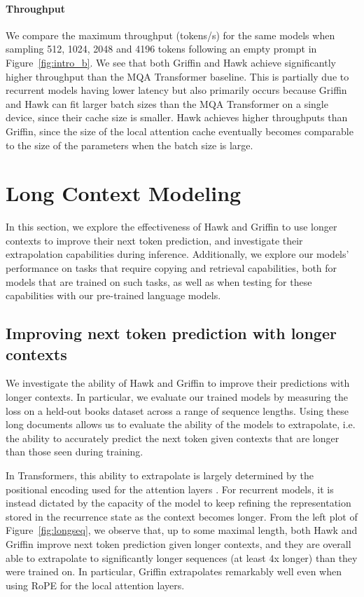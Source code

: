\paragraph{Throughput}
We compare the maximum throughput (tokens/s) for the same models when sampling 512, 1024, 2048 and 4196 tokens following an empty prompt in Figure~\ref{fig:intro_b}. 
We see that both Griffin and Hawk achieve significantly higher throughput than the MQA Transformer baseline. This is partially due to recurrent models having lower latency but also primarily occurs because Griffin and Hawk can fit larger batch sizes than the MQA Transformer on a single device, since their cache size is smaller. Hawk achieves higher throughputs than Griffin, since the size of the local attention cache eventually becomes comparable to the size of the parameters when the batch size is large.

\section{Long Context Modeling}
\label{sec:long_seq}

In this section, we explore the effectiveness of Hawk and Griffin to use longer contexts to improve their next token prediction, and investigate their extrapolation capabilities during inference. Additionally, we explore our models' performance on tasks that require copying and retrieval capabilities, both for models that are trained on such tasks, as well as when testing for these capabilities with our pre-trained language models.

\subsection{Improving next token prediction with longer contexts}

We investigate the ability of Hawk and Griffin to improve their predictions with longer contexts. In particular, we evaluate our trained models by measuring the loss on a held-out books dataset across a range of sequence lengths. Using these long documents allows us to evaluate the ability of the models to extrapolate, i.e. the ability to accurately predict the next token given contexts that are longer than those seen during training.

In Transformers, this ability to extrapolate is largely determined by the positional encoding used for the attention layers \citep{kazemnejad2024impact}. For recurrent models, it is instead dictated by the capacity of the model to keep refining the representation stored in the recurrence state as the context becomes longer. From the left plot of Figure~\ref{fig:longseq}, we observe that, up to some maximal length, both Hawk and Griffin improve next token prediction given longer contexts, and they are overall able to extrapolate to significantly longer sequences (at least 4x longer) than they were trained on. In particular, Griffin extrapolates remarkably well even when using RoPE \citep{su2021roformer} for the local attention layers.

